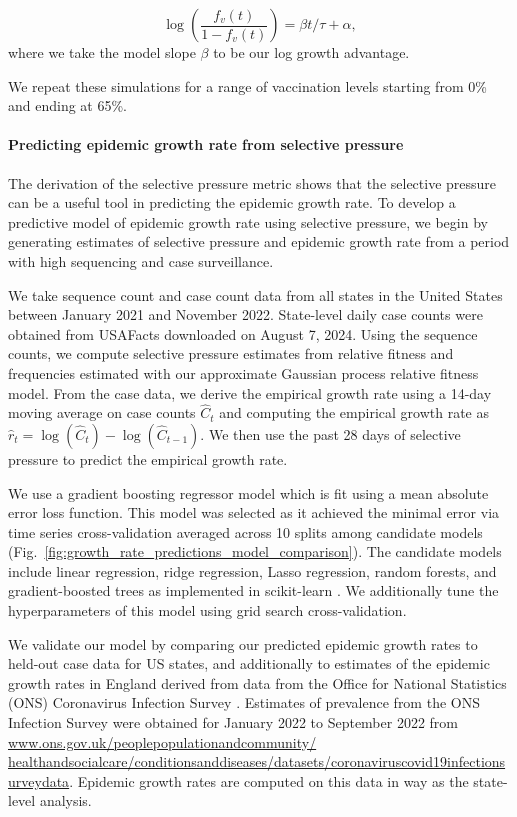 \documentclass[11pt,oneside,letterpaper]{article}
\begin{document}
\begin{equation*}
\log \left( \frac{f_v(t)}{1 - f_v(t)} \right) = \beta t / \tau + \alpha,
\end{equation*}
where we take the model slope $\beta$ to be our log growth advantage.

We repeat these simulations for a range of vaccination levels starting from 0\% and ending at 65\%.

\paragraph{Predicting epidemic growth rate from selective pressure}

The derivation of the selective pressure metric shows that the selective pressure can be a useful tool in predicting the epidemic growth rate.
To develop a predictive model of epidemic growth rate using selective pressure, we begin by generating estimates of selective pressure and epidemic growth rate from a period with high sequencing and case surveillance.

We take sequence count and case count data from all states in the United States between January 2021 and November 2022.
State-level daily case counts were obtained from USAFacts downloaded on August 7, 2024.
Using the sequence counts, we compute selective pressure estimates from relative fitness and frequencies estimated with our approximate Gaussian process relative fitness model.
From the case data, we derive the empirical growth rate using a 14-day moving average on case counts $\hat{C}_{t}$ and computing the empirical growth rate as $\hat{r}_{t} = \log(\hat{C}_{t}) - \log(\hat{C}_{t-1})$.
We then use the past 28 days of selective pressure to predict the empirical growth rate.

We use a gradient boosting regressor model which is fit using a mean absolute error loss function.
This model was selected as it achieved the minimal error via time series cross-validation averaged across 10 splits among candidate models (Fig.~\ref{fig:growth_rate_predictions_model_comparison}).
The candidate models include linear regression, ridge regression, Lasso regression, random forests, and gradient-boosted trees as implemented in scikit-learn \cite{scikit-learn}.
We additionally tune the hyperparameters of this model using grid search cross-validation.

We validate our model by comparing our predicted epidemic growth rates to held-out case data for US states, and additionally to estimates of the epidemic growth rates in England derived from data from the Office for National Statistics (ONS) Coronavirus Infection Survey \cite{pouwels2021community}.
Estimates of prevalence from the ONS Infection Survey were obtained for January 2022 to September 2022 from \href{https://www.ons.gov.uk/peoplepopulationandcommunity/healthandsocialcare/conditionsanddiseases/datasets/coronaviruscovid19infectionsurveydata}{www.ons.gov.uk/peoplepopulationandcommunity/ healthandsocialcare/conditionsanddiseases/datasets/coronaviruscovid19infectionsurveydata}.
Epidemic growth rates are computed on this data in way as the state-level analysis.
\end{document}
